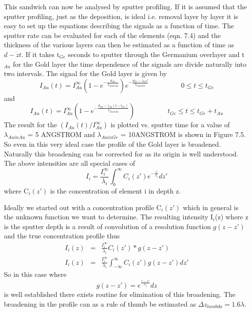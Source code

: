  This sandwich can now be analysed by sputter profiling. If
 it is assumed that the sputter profiling, just as the
 deposition, is ideal i.e. removal layer by layer it is easy
 to set up the equations describing the signals as a function
 of time. The sputter rate can be evaluated for each of the
 elements (eqn. 7.4) and the thickness of the various layers
 can then be estimated as a function of time as $d-\dot{z}
 t$. If it takes t$_{Ge}$ seconds to sputter through the
 Germanium overlayer and t$_{Au}$ for the Gold layer the time
 dependence of the signals are divide naturally into two
 intervals. The signal for the Gold layer is given by
 \begin{equation} I_{Au}(t) =
 I^{\infty}_{Au}(1-e^{-\frac{d_{Au}}{\lambda_{Au in
 Au}}})e^{-\frac{d_{Ge}-\dot{z}_{Ge} t}{\lambda_{Au in Ge}}}
 \hspace{2cm} 0 \leq t \leq t_{Ge} \end{equation} and
 \begin{equation} I_{Au}(t) =
 I^{\infty}_{Au}(1-e^{-\frac{d_{Au}-\dot{z}_{Au} (t-t_{Ge})}{\lambda_{Au
 in Au}}}) \hspace{2cm} t_{Ge} \leq t \leq t_{Ge}+t_{Au}
 \end{equation} The result for the
 $(I_{Au}(t)/I_{Au}^{\infty})$ is plotted vs. sputter
 time for a value of $\lambda_{Au in Au}$ = 5 ANGSTROM and
 $\lambda_{Au in Ge}$ = 10ANGSTROM is shown in Figure 7.5. So even
 in this very ideal case the profile of the Gold layer is
 broadened. Naturally this broadening can be corrected for as
 its origin is well understood. The above intensities are all
 special cases of \begin{equation}
 I_{i}=\frac{I^{\infty}_{i}}{\lambda_{i}}\int^{\infty}_{0}C_{i}(z')e^{-\frac{z'}{\lambda_{i}}}dz'
 \end{equation} where C$_{i}(z')$ is the concentration of
 element i in depth z.

 Ideally we started out with a concentration profile
 C$_{i}(z')$ which in general is the unknown function we want
 to determine. The resulting intensity I$_{i}$(z) where z is
 the sputter depth is a result of convolution of a resolution
 function $g(z-z')$ and the true concentration profile thus
\begin{eqnarray}
 I_{i}(z)
 & = & \frac{I^{\infty}_{i}}{\lambda_{i}}C_{i}(z')*g(z-z')\\
 I_{i}(z) & = & \frac{I^{\infty}_{i}}{\lambda_{i}}
 \int^{\infty}_{-\infty}C_{i}(z')g(z-z')dz' \end{eqnarray}
 So in this case where
\begin{equation}
 g(z-z')=e^{\frac{z-z'}{\lambda_{i}}}dz
 \end{equation} is well established there exists
 routine for elimination of this broadening. The broadening
 in the profile can as a rule of thumb be estimated as $\Delta
 z_{lambda}= 1.6 \lambda$.

